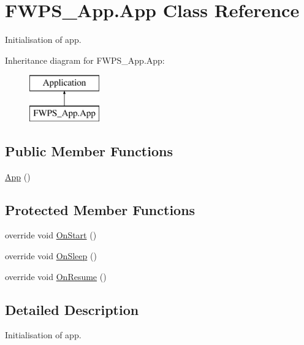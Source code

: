 \hypertarget{class_f_w_p_s___app_1_1_app}{}\section{F\+W\+P\+S\+\_\+\+App.\+App Class Reference}
\label{class_f_w_p_s___app_1_1_app}


Initialisation of app.  


Inheritance diagram for F\+W\+P\+S\+\_\+\+App.\+App\+:\begin{figure}[H]
\begin{center}
\leavevmode
\includegraphics[height=2.000000cm]{class_f_w_p_s___app_1_1_app}
\end{center}
\end{figure}
\subsection*{Public Member Functions}
\begin{DoxyCompactItemize}
\item 
\mbox{\hyperlink{class_f_w_p_s___app_1_1_app_a0280f170cab24f4673143a2d6f9e96d2}{App}} ()
\end{DoxyCompactItemize}
\subsection*{Protected Member Functions}
\begin{DoxyCompactItemize}
\item 
override void \mbox{\hyperlink{class_f_w_p_s___app_1_1_app_a5f5cb73d4c0687a89db8c22bfab2b564}{On\+Start}} ()
\item 
override void \mbox{\hyperlink{class_f_w_p_s___app_1_1_app_ac045f94c3813b6f7bf23d6338e269616}{On\+Sleep}} ()
\item 
override void \mbox{\hyperlink{class_f_w_p_s___app_1_1_app_ae61e4865dc328d5b1e68998f9f02db06}{On\+Resume}} ()
\end{DoxyCompactItemize}


\subsection{Detailed Description}
Initialisation of app. 

